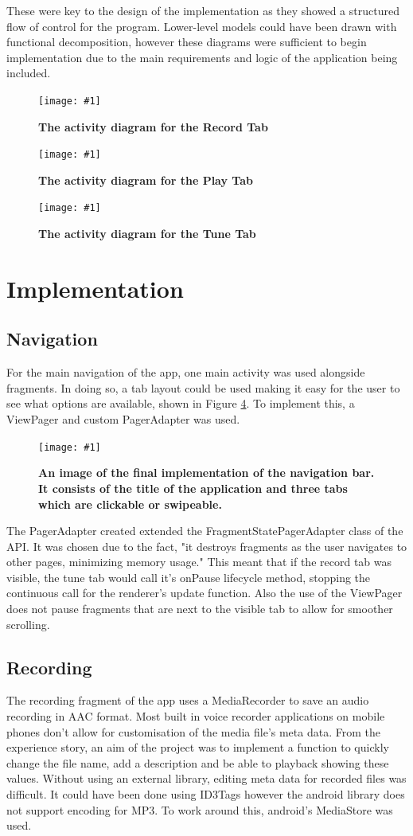 \documentclass[conference]{acmsiggraph}
\newcommand{\figuremacroF}[3]{
	\begin{figure}[H] %
		\centering
		\texttt{[image: \#1]}
		\caption[#2]{\textbf{#2}}
		\label{fig:#1}
	\end{figure}
}
\begin{document}
These were key to the design of the implementation as they showed a structured flow of control for the program. Lower-level models could have been drawn with functional decomposition, however these diagrams were sufficient to begin implementation due to the main requirements and logic of the application being included.

\figuremacroF
{RecordTab}
{The activity diagram for the Record Tab}
{1.0}

\figuremacroF
{PlayTab}
{The activity diagram for the Play Tab}
{1.0}

\figuremacroF
{TuneTab}
{The activity diagram for the Tune Tab}
{1.0}
 
\section{Implementation}

\subsection{Navigation}

For the main navigation of the app, one main activity was used alongside fragments. In doing so, a tab layout could be used making it easy for the user to see what options are available, shown in Figure \ref{fig:navBar}. To implement this, a ViewPager and custom PagerAdapter was used.

\figuremacroF
{navBar}
{An image of the final implementation of the navigation bar. It consists of the title of the application and three tabs which are clickable or swipeable.}
{1.0}

The PagerAdapter created extended the FragmentStatePagerAdapter class of the API. It was chosen due to the fact, "it destroys fragments as the user navigates to other pages, minimizing memory usage." \cite{swipeArticle} This meant that if the record tab was visible, the tune tab would call it's onPause lifecycle method, stopping the continuous call for the renderer's update function. Also the use of the ViewPager does not pause fragments that are next to the visible tab to allow for smoother scrolling.


\subsection{Recording}

The recording fragment of the app uses a MediaRecorder to save an audio recording in AAC format. Most built in voice recorder applications on mobile phones don't allow for customisation of the media file's meta data. From the experience story, an aim of the project was to implement a function to quickly change the file name, add a description and be able to playback showing these values. Without using an external library, editing meta data for recorded files was difficult. It could have been done using ID3Tags however the android library does not support encoding for MP3. \cite{SupportedMedia} To work around this, android's MediaStore was used.
\end{document}
